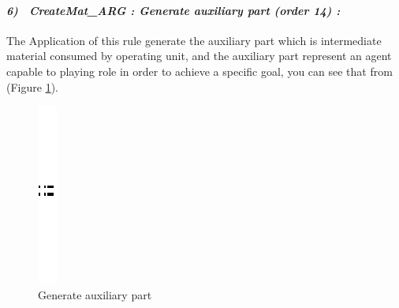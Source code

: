 \paragraph{\emph{6)~ CreateMat_ARG : Generate auxiliary part  (order 14) :} }

The Application of this rule generate the auxiliary part which is intermediate material consumed by operating unit, and the auxiliary part represent an agent capable to playing role in order to achieve a specific goal, you can see that from (Figure \ref{fig:Generate auxiliary part}).
\vspace{1cm}
\begin{figure}[th]
\centering 
	\quad{}
		\includegraphics{ch3/img/sep}
	\quad{}
\caption{\label{fig:Generate auxiliary part} Generate auxiliary part}
\end{figure}
\vspace{1cm}





